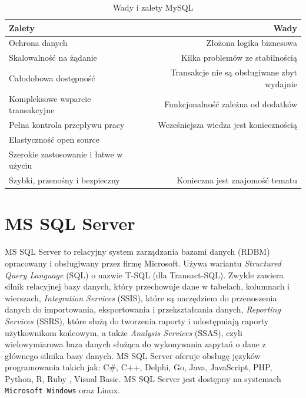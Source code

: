 \documentclass[oneside,polski,logo,indent]{amuthesis}
\begin{document}
\begin{table}[H]
\caption{Wady i zalety MySQL}
\label{tabela-MySQL}
\centering
\begin{adjustbox}{width=1\textwidth}
\small
\begin{tabular}{lr}
\toprule
Zalety & Wady\\
\midrule
Ochrona danych & Złożona logika biznesowa\\
Skalowalność na żądanie & Kilka problemów ze stabilnością\\
Całodobowa dostępność & Transakcje nie są obsługiwane zbyt wydajnie\\
Kompleksowe wsparcie transakcyjne & Funkcjonalność zależna od dodatków\\
Pełna kontrola przepływu pracy & Wcześniejsza wiedza jest koniecznością\\
Elastyczność open source &\\
Szerokie zastosowanie i łatwe w użyciu &\\
Szybki, przenośny i bezpieczny & Konieczna jest znajomość tematu\\
\bottomrule
\end{tabular}
\end{adjustbox}
\end{table}
\section{MS SQL Server}
MS SQL Server to relacyjny system zarządzania bazami danych (RDBM) opracowany i obsługiwany przez firmę Microsoft. Używa wariantu \emph{Structured Query Language} (SQL) o nazwie T-SQL (dla Transact-SQL). Zwykle zawiera silnik relacyjnej bazy danych, który przechowuje dane w tabelach, kolumnach i wierszach,  \emph{Integration Services} (SSIS), które są narzędziem do przenoszenia danych do importowania, eksportowania i przekształcania danych,  \emph{Reporting Services} (SSRS), które służą do tworzenia raporty i udostępniają raporty użytkownikom końcowym, a także  \emph{Analysis Services} (SSAS), czyli wielowymiarowa baza danych służąca do wykonywania zapytań o dane z głównego silnika bazy danych. 
MS SQL Server oferuje obsługę języków programowania takich jak: C\#, C++, Delphi, Go, Java, JavaScript, PHP, Python, R, Ruby , Visual Basic.
MS SQL Server jest dostępny na systemach \texttt{Microsoft Windows} oraz Linux.
\end{document}
